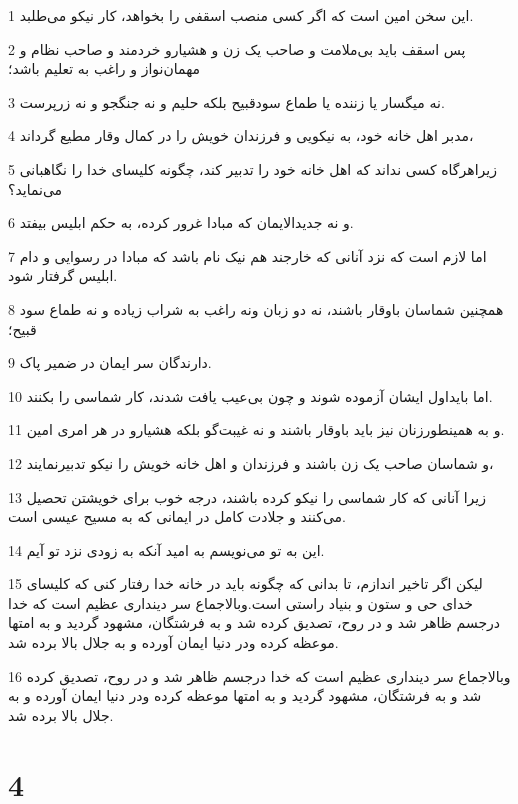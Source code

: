 \par 1 این سخن امین است که اگر کسی منصب اسقفی را بخواهد، کار نیکو می‌طلبد.
\par 2 پس اسقف باید بی‌ملامت و صاحب یک زن و هشیارو خردمند و صاحب نظام و مهمان‌نواز و راغب به تعلیم باشد؛
\par 3 نه میگسار یا زننده یا طماع سودقبیح بلکه حلیم و نه جنگجو و نه زرپرست.
\par 4 مدبر اهل خانه خود، به نیکویی و فرزندان خویش را در کمال وقار مطیع گرداند،
\par 5 زیراهرگاه کسی نداند که اهل خانه خود را تدبیر کند، چگونه کلیسای خدا را نگاهبانی می‌نماید؟
\par 6 و نه جدیدالایمان که مبادا غرور کرده، به حکم ابلیس بیفتد.
\par 7 اما لازم است که نزد آنانی که خارجند هم نیک نام باشد که مبادا در رسوایی و دام ابلیس گرفتار شود.
\par 8 همچنین شماسان باوقار باشند، نه دو زبان ونه راغب به شراب زیاده و نه طماع سود قبیح؛
\par 9 دارندگان سر ایمان در ضمیر پاک.
\par 10 اما بایداول ایشان آزموده شوند و چون بی‌عیب یافت شدند، کار شماسی را بکنند.
\par 11 و به همینطورزنان نیز باید باوقار باشند و نه غیبت‌گو بلکه هشیارو در هر امری امین.
\par 12 و شماسان صاحب یک زن باشند و فرزندان و اهل خانه خویش را نیکو تدبیرنمایند،
\par 13 زیرا آنانی که کار شماسی را نیکو کرده باشند، درجه خوب برای خویشتن تحصیل می‌کنند و جلادت کامل در ایمانی که به مسیح عیسی است.
\par 14 این به تو می‌نویسم به امید آنکه به زودی نزد تو آیم.
\par 15 لیکن اگر تاخیر اندازم، تا بدانی که چگونه باید در خانه خدا رفتار کنی که کلیسای خدای حی و ستون و بنیاد راستی است.وبالاجماع سر دینداری عظیم است که خدا درجسم ظاهر شد و در روح، تصدیق کرده شد و به فرشتگان، مشهود گردید و به امتها موعظه کرده ودر دنیا ایمان آورده و به جلال بالا برده شد.
\par 16 وبالاجماع سر دینداری عظیم است که خدا درجسم ظاهر شد و در روح، تصدیق کرده شد و به فرشتگان، مشهود گردید و به امتها موعظه کرده ودر دنیا ایمان آورده و به جلال بالا برده شد.

\chapter{4}

